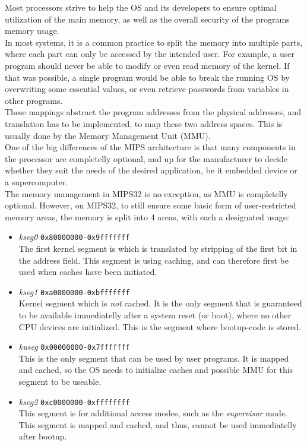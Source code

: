 Most processors strive to help the OS and its developers to ensure optimal
utilization of the main memory, as well as the overall security of the programs
memory usage.\\
In most systems, it is a common practice to split the memory into multiple
parts, where each part can only be accessed by the intended user. For example,
a user program should never be able to modify or even read memory of the kernel.
If that was possible, a single program would be able to break the running OS by
overwriting some essential values, or even retrieve passwords from variables in
other programs.\\
These mappings abstract the program addresses from the physical addresses, and
translation has to be implemented, to map these two address spaces. This is
usually done by the Memory Management Unit (MMU).\\
One of the big differences of the MIPS architecture is that many components in
the processor are completelly optional, and up for the manufacturer to decide
whether they suit the needs of the desired application, be it embedded device
or a supercomputer.\\
The memory management in MIPS32 is no exception, as MMU is completelly optional.
However, on MIPS32, to still ensure some basic form of user-restricted memory areas, the
memory is split into 4 areas, with each a designated
usage:\cite{imgtec:Memory_Map}\cite{see_mips_run}
\begin{itemize}
\item \textit{kseg0} \texttt{0x80000000-0x9fffffff}\\
The first kernel segment is which is translated by stripping of the first bit
in the address field. This segment is using caching, and can therefore first
be used when caches have been initiated.\cite{see_mips_run}
\item \textit{kseg1} \texttt{0xa0000000-0xbfffffff}\\
Kernel segment which is \textit{not} cached. It is the only segment that is
guaranteed to be available immediatelly after a system reset (or boot), where
no other CPU devices are initialized.
This is the segment where bootup-code is stored.
\item \textit{kuseg} \texttt{0x00000000-0x7fffffff}\\
This is the only segment that can be used by user programs. It is mapped and
cached, so the OS needs to initialize caches and possible MMU for this segment
to be useable.
\item \textit{kseg2} \texttt{0xc0000000-0xffffffff}\\
This segment is for additional access modes, such as the \textit{supervisor}
mode. This segment is mapped and cached, and thus, cannot be used immediatelly after
bootup.
\end{itemize}

